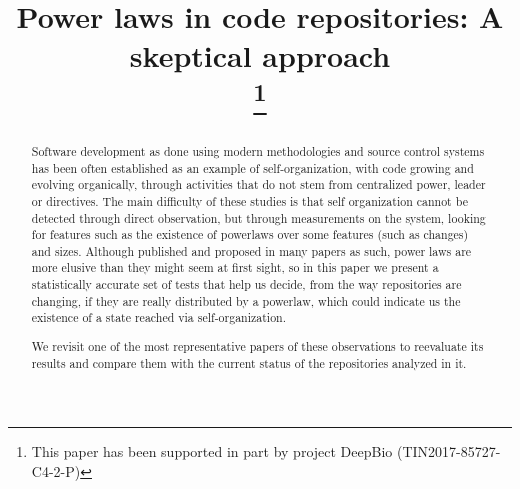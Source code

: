 \documentclass[conference]{IEEEtran}
\begin{document}
\title{Power laws in code repositories: A skeptical approach\\
	\thanks{This paper has been supported in part by
		project DeepBio (TIN2017-85727-C4-2-P)}
}

\author{
	\and
}

\maketitle

\begin{abstract}
  
Software development as done using modern methodologies and source
control systems has been often established as an example of
self-organization, with code growing and evolving organically, through
activities that do not stem from centralized power, leader or
directives.  The main difficulty of these studies is that self
organization cannot be detected through direct observation, but
through measurements on the system, looking for features such as the
existence of powerlaws over some features (such as changes) and sizes.
Although published and proposed in many papers as such, power laws are
more elusive than they might seem at first sight, so in this paper we
present a statistically accurate set of tests that help us decide,
from the way repositories are changing, if they are really distributed
by a powerlaw, which could indicate us the existence of a state
reached via self-organization.

We revisit one of the most representative papers of these observations to reevaluate its results and compare them
with the current status of the repositories analyzed in it.




\end{abstract}
\end{document}
